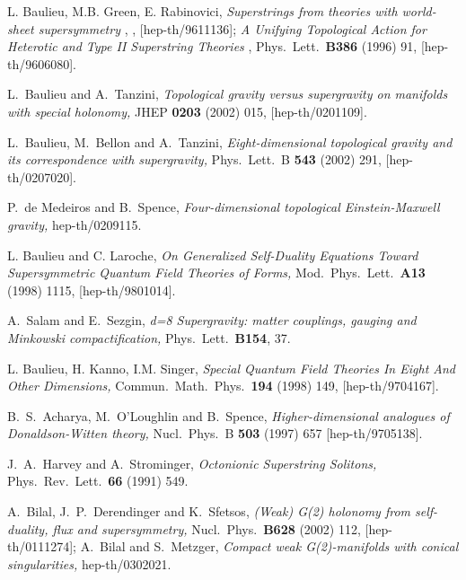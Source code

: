 \documentclass[a4paper,12pt]{article}
\begin{document}
\begin{thebibliography}{15}

L. Baulieu,  M.B. Green, E. Rabinovici,
{ \it Superstrings from theories with \coordHE{} world-sheet supersymmetry  },      
,  [hep-th/9611136]; 
{\it  A Unifying Topological Action for Heterotic and Type II Superstring
Theories }, 
Phys.\ Lett.\ {\bf B386} (1996) 91, [hep-th/9606080].

L.~Baulieu and A.~Tanzini,
{\it Topological gravity versus supergravity on manifolds with special holonomy,}
JHEP {\bf 0203} (2002) 015,
[hep-th/0201109].  

L.~Baulieu, M.~Bellon and A.~Tanzini,
{\it Eight-dimensional topological gravity and its correspondence with supergravity,}
Phys.\ Lett.\ B {\bf 543} (2002) 291,
[hep-th/0207020].

P.~de Medeiros and B.~Spence,
{\it Four-dimensional topological Einstein-Maxwell gravity,}
hep-th/0209115.

  L. Baulieu and C. Laroche,
{ \it On Generalized Self-Duality Equations Toward
 Supersymmetric   Quantum Field Theories of Forms,  }      
Mod.\ Phys.\ Lett.\ {\bf  A13} (1998) 1115, [hep-th/9801014].

A.~Salam and E.~Sezgin,
{\it d=8 Supergravity: matter couplings, gauging and Minkowski
compactification,}
Phys.\ Lett.\ {\bf B154}, 37.

L. Baulieu,  H. Kanno, I.M.    Singer,  
{ \it Special Quantum Field Theories In Eight And Other
Dimensions,  }  
Commun.\ Math.\ Phys.\ {\bf  194} (1998) 149, 
[hep-th/9704167].

B.~S.~Acharya, M.~O'Loughlin and B.~Spence,
{\it Higher-dimensional analogues of Donaldson-Witten theory,}
Nucl.\ Phys.\ B {\bf 503} (1997) 657
[hep-th/9705138].

J.~A.~Harvey and A.~Strominger,
{\it Octonionic Superstring Solitons,}
Phys.\ Rev.\ Lett.\ {\bf 66} (1991) 549.

A.~Bilal, J.~P.~Derendinger and K.~Sfetsos,
{\it (Weak) G(2) holonomy from self-duality, flux and supersymmetry,}
Nucl.\ Phys.\  {\bf B628} (2002) 112,
[hep-th/0111274];
A.~Bilal and S.~Metzger,
{\it Compact weak G(2)-manifolds with conical singularities,}
hep-th/0302021.

\end{thebibliography}
\end{document}
